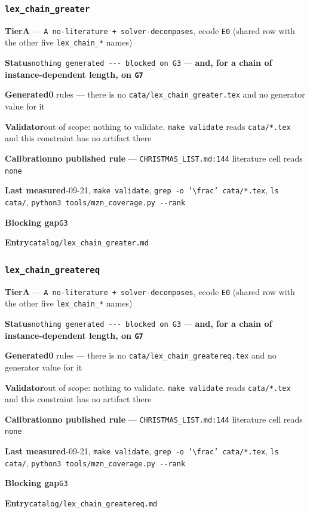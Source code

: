\documentclass[10pt,a4paper]{article}
\newcommand{\entryfield}[2]{{\raggedright\textbf{#1}\quad #2\par}}
\begin{document}
\subsubsection*{\texttt{lex\_\allowbreak{}chain\_\allowbreak{}greater}}
\label{entry:lex-chain-greater}
\entryfield{Tier}{\textbf{A} --- \texttt{A no-\allowbreak{}literature + solver-\allowbreak{}decomposes}, ecode \texttt{E0} (shared row with the other five \texttt{lex\_chain\_*} names)}
\entryfield{Status}{\texttt{nothing generated -\allowbreak{}-\allowbreak{}-\allowbreak{} blocked on G3} --- \textbf{and, for a chain of instance-dependent length, on \texttt{G7}}}
\entryfield{Generated}{\textbf{0} rules --- there is no \texttt{cata/\allowbreak{}lex\_\allowbreak{}chain\_\allowbreak{}greater.\allowbreak{}tex} and no generator value for it}
\entryfield{Validator}{out of scope: nothing to validate. \texttt{make validate} reads \texttt{cata/*.tex} and this constraint has no artifact there}
\entryfield{Calibration}{\textbf{no published rule} --- \texttt{CHRISTMAS\_LIST.md:144} literature cell reads \texttt{none}}
\entryfield{Last measured}{2026-09-21, \texttt{make validate}, \texttt{grep -\allowbreak{}o '\textbackslash{}frac' cata/\allowbreak{}*.\allowbreak{}tex}, \texttt{ls cata/}, \texttt{python3 tools/\allowbreak{}mzn\_\allowbreak{}coverage.\allowbreak{}py -\allowbreak{}-\allowbreak{}rank}}
\entryfield{Blocking gap}{\texttt{G3}}
\entryfield{Entry}{\texttt{catalog/lex\_chain\_greater.md}}
\subsubsection*{\texttt{lex\_\allowbreak{}chain\_\allowbreak{}greatereq}}
\label{entry:lex-chain-greatereq}
\entryfield{Tier}{\textbf{A} --- \texttt{A no-\allowbreak{}literature + solver-\allowbreak{}decomposes}, ecode \texttt{E0} (shared row with the other five \texttt{lex\_chain\_*} names)}
\entryfield{Status}{\texttt{nothing generated -\allowbreak{}-\allowbreak{}-\allowbreak{} blocked on G3} --- \textbf{and, for a chain of instance-dependent length, on \texttt{G7}}}
\entryfield{Generated}{\textbf{0} rules --- there is no \texttt{cata/\allowbreak{}lex\_\allowbreak{}chain\_\allowbreak{}greatereq.\allowbreak{}tex} and no generator value for it}
\entryfield{Validator}{out of scope: nothing to validate. \texttt{make validate} reads \texttt{cata/*.tex} and this constraint has no artifact there}
\entryfield{Calibration}{\textbf{no published rule} --- \texttt{CHRISTMAS\_LIST.md:144} literature cell reads \texttt{none}}
\entryfield{Last measured}{2026-09-21, \texttt{make validate}, \texttt{grep -\allowbreak{}o '\textbackslash{}frac' cata/\allowbreak{}*.\allowbreak{}tex}, \texttt{ls cata/}, \texttt{python3 tools/\allowbreak{}mzn\_\allowbreak{}coverage.\allowbreak{}py -\allowbreak{}-\allowbreak{}rank}}
\entryfield{Blocking gap}{\texttt{G3}}
\entryfield{Entry}{\texttt{catalog/lex\_chain\_greatereq.md}}
\end{document}
